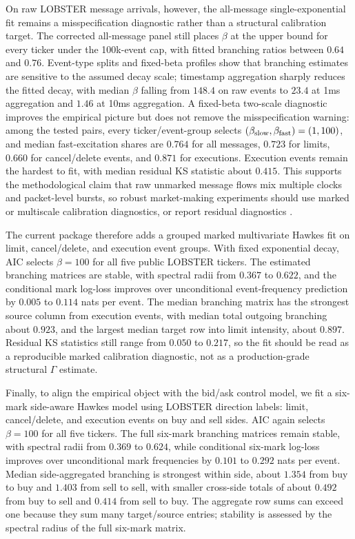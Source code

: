 \documentclass[11pt]{article}
\begin{document}
On raw LOBSTER message arrivals, however, the all-message single-exponential
fit remains a misspecification diagnostic rather than a structural calibration
target. The corrected all-message panel still places $\beta$ at the upper
bound for every ticker under the 100k-event cap, with fitted branching ratios
between $0.64$ and $0.76$. Event-type splits and fixed-beta profiles show that
branching estimates are sensitive to the assumed decay scale; timestamp
aggregation sharply reduces the fitted decay, with median $\beta$ falling from
$148.4$ on raw events to $23.4$ at 1ms aggregation and $1.46$ at 10ms
aggregation. A fixed-beta two-scale diagnostic improves the empirical picture
but does not remove the misspecification warning: among the tested pairs, every
ticker/event-group selects $(\beta_{\rm slow},\beta_{\rm fast})=(1,100)$, and
median fast-excitation shares are $0.764$ for all messages, $0.723$ for limits,
$0.660$ for cancel/delete events, and $0.871$ for executions. Execution events
remain the hardest to fit, with median residual KS statistic about $0.415$.
This supports the methodological claim that raw unmarked message flows mix
multiple clocks and packet-level bursts, so robust market-making experiments
should use marked or multiscale calibration diagnostics, or report residual diagnostics
\cite{BacryMuzy2015,Ogata1988}.

The current package therefore adds a grouped marked multivariate Hawkes fit on
limit, cancel/delete, and execution event groups. With fixed exponential decay,
AIC selects $\beta=100$ for all five public LOBSTER tickers. The estimated
branching matrices are stable, with spectral radii from $0.367$ to $0.622$,
and the conditional mark log-loss improves over unconditional event-frequency
prediction by $0.005$ to $0.114$ nats per event. The median branching matrix
has the strongest source column from execution events, with median total
outgoing branching about $0.923$, and the largest median target row into limit
intensity, about $0.897$. Residual KS statistics still range from $0.050$ to
$0.217$, so the fit should be read as a reproducible marked calibration
diagnostic, not as a production-grade structural $\Gamma$ estimate.

Finally, to align the empirical object with the bid/ask control model, we fit a
six-mark side-aware Hawkes model using LOBSTER direction labels: limit,
cancel/delete, and execution events on buy and sell sides. AIC again selects
$\beta=100$ for all five tickers. The full six-mark branching matrices remain
stable, with spectral radii from $0.369$ to $0.624$, while conditional
six-mark log-loss improves over unconditional mark frequencies by $0.101$ to
$0.292$ nats per event. Median side-aggregated branching is strongest within
side, about $1.354$ from buy to buy and $1.403$ from sell to sell, with smaller
cross-side totals of about $0.492$ from buy to sell and $0.414$ from sell to
buy. The aggregate row sums can exceed one because they sum many target/source
entries; stability is assessed by the spectral radius of the full six-mark
matrix.
\end{document}
